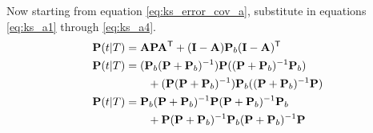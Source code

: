 Now starting from equation \eqref{eq:ks_error_cov_a}, substitute in equations
\eqref{eq:ks_a1} through \eqref{eq:ks_a4}.
\begin{align*}
  \mathbf{P}(t|T) &=
    \mathbf{A}\mathbf{P}\mathbf{A}^\mathsf{T} + (\mathbf{I} - \mathbf{A})\mathbf{P}_b(\mathbf{I} - \mathbf{A})^\mathsf{T}
    \\
  \mathbf{P}(t|T) &=
    (\mathbf{P}_b(\mathbf{P} + \mathbf{P}_b)^{-1})\mathbf{P}
      ((\mathbf{P} + \mathbf{P}_b)^{-1}\mathbf{P}_b) \\
    &\qquad +
    (\mathbf{P}(\mathbf{P} + \mathbf{P}_b)^{-1})\mathbf{P}_b
      ((\mathbf{P} + \mathbf{P}_b)^{-1}\mathbf{P}) \\
  \mathbf{P}(t|T) &=
    \mathbf{P}_b(\mathbf{P} + \mathbf{P}_b)^{-1}\mathbf{P}
    (\mathbf{P} + \mathbf{P}_b)^{-1}\mathbf{P}_b \\
    &\qquad + \mathbf{P}
      (\mathbf{P} + \mathbf{P}_b)^{-1}\mathbf{P}_b
      (\mathbf{P} + \mathbf{P}_b)^{-1}\mathbf{P}
\end{align*}

